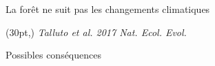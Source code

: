 \documentclass[11pt, compress, aspectratio=1610]{beamer}
\newcommand\smallcitation[1]{%
\begin{textblock*}{\textwidth}(30pt,\textheight)
	\raggedleft \footnotesize\textit{#1}
\end{textblock*}}
\begin{document}
\begin{frame}{La forêt ne suit pas les changements climatiques}
\protect\hypertarget{la-foruxeat-ne-suit-pas-les-changements-climatiques}{}

\vspace*{-15mm}
\begin{center}
\end{center}
\smallcitation{Talluto \textit{et al}. 2017 Nat. Ecol. Evol.}

\end{frame}

\begin{frame}{Possibles conséquences}
\protect\hypertarget{possibles-consuxe9quences}{}

\vspace*{-15mm}
\begin{center}
\end{center}

\end{frame}
\end{document}
